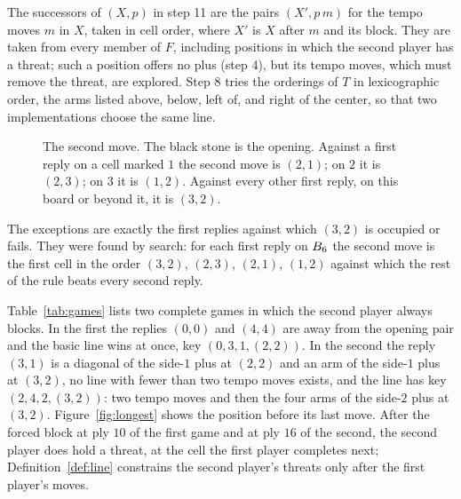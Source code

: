 \documentclass[11pt]{amsart}
\theoremstyle{definition}
\theoremstyle{remark}
\begin{document}
The successors of $(X, p)$ in step 11 are the pairs $(X', p\,m)$ for
the tempo moves $m$ in $X$, taken in cell order, where $X'$ is $X$
after $m$ and its block. They are taken from every member of $F$,
including positions in which the second player has a threat; such a
position offers no plus (step 4), but its tempo moves, which must
remove the threat, are explored. Step 8 tries the orderings of $T$ in
lexicographic order, the arms listed above, below, left of, and right
of the center, so that two implementations choose the same line.

\begin{figure}[ht]
\centering

\caption{The second move. The black stone is the opening. Against a
first reply on a cell marked $1$ the second move is $(2,1)$; on $2$ it
is $(2,3)$; on $3$ it is $(1,2)$. Against every other first reply, on
this board or beyond it, it is $(3,2)$.}
\label{fig:second}
\end{figure}

The exceptions are exactly the first replies against which $(3,2)$ is
occupied or fails. They were found by search: for each first reply on $B_6$ the
second move is the first cell in the order $(3,2)$, $(2,3)$, $(2,1)$,
$(1,2)$ against which the rest of the rule beats every second reply.

Table~\ref{tab:games} lists two complete games in which the second
player always blocks. In the first the replies $(0,0)$ and $(4,4)$ are
away from the opening pair and the basic line wins at once, key
$(0,3,1,(2,2))$.
In the second the reply $(3,1)$ is a diagonal of the side-$1$ plus at
$(2,2)$ and an arm of the side-$1$ plus at $(3,2)$,
no line with fewer than two tempo moves exists, and the line has key
$(2,4,2,(3,2))$: two tempo moves and then the four arms of the side-$2$
plus at $(3,2)$. Figure~\ref{fig:longest} shows the position before its
last move. After the forced block at ply $10$ of the first game and at
ply $16$ of the second, the second player does hold a threat, at the
cell the first player completes next; Definition~\ref{def:line}
constrains the second player's threats only after the first player's
moves.
\end{document}
